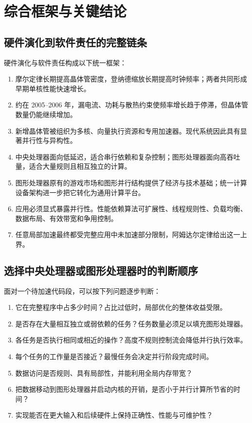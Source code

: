\section{综合框架与关键结论}

\subsection{硬件演化到软件责任的完整链条}

硬件演化与软件责任构成以下统一框架：
\begin{enumerate}
  \item 摩尔定律长期提高晶体管密度，登纳德缩放长期提高时钟频率；两者共同形成早期单核性能快速增长。
  \item 约在 2005--2006 年，漏电流、功耗与散热约束使频率增长趋于停滞，但晶体管数量仍能继续增加。
  \item 新增晶体管被组织为多核、向量执行资源和专用加速器。现代系统因此具有显著并行性与异构性。
  \item 中央处理器面向低延迟，适合串行依赖和复杂控制；图形处理器面向高吞吐量，适合大量规则且相互独立的计算。
  \item 图形处理器原有的游戏市场和图形并行结构提供了经济与技术基础；统一计算设备架构进一步把它转化为通用计算平台。
  \item 应用必须显式暴露并行性。性能依赖算法可扩展性、线程规则性、负载均衡、数据布局、有效带宽和争用控制。
  \item 任意局部加速最终都受完整应用中未加速部分限制，阿姆达尔定律给出这一上界。
\end{enumerate}

\subsection{选择中央处理器或图形处理器时的判断顺序}

面对一个待加速代码段，可以按下列问题逐步判断：
\begin{enumerate}
  \item 它在完整程序中占多少时间？占比过低时，局部优化的整体收益受限。
  \item 是否存在大量相互独立或弱依赖的任务？任务数量必须足以填充图形处理器。
  \item 各任务是否执行相同或相近的操作？高度不规则控制流会降低并行执行效率。
  \item 每个任务的工作量是否接近？最慢任务会决定并行阶段完成时间。
  \item 数据访问是否规则、具有局部性，并能利用全局内存带宽？
  \item 把数据移动到图形处理器并启动内核的开销，是否小于并行计算所节省的时间？
  \item 实现能否在更大输入和后续硬件上保持正确性、性能与可维护性？
\end{enumerate}

